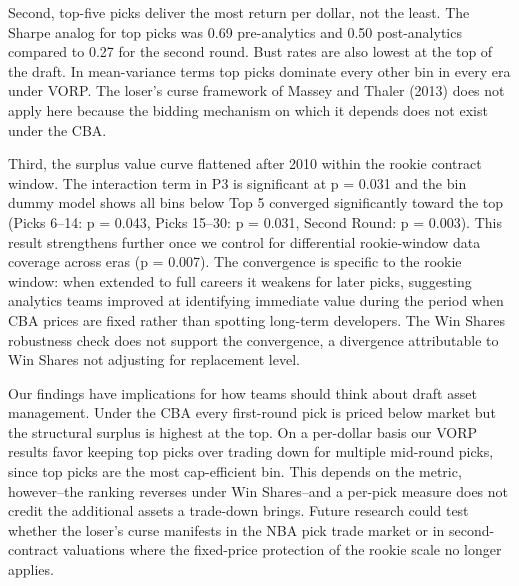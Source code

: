 \documentclass[12pt,letterpaper]{article}
\begin{document}
Second, top-five picks deliver the most return per dollar, not the least. The Sharpe analog for top picks was 0.69 pre-analytics and 0.50 post-analytics compared to 0.27 for the second round. Bust rates are also lowest at the top of the draft. In mean-variance terms top picks dominate every other bin in every era under VORP. The loser's curse framework of Massey and Thaler (2013) does not apply here because the bidding mechanism on which it depends does not exist under the CBA.

Third, the surplus value curve flattened after 2010 within the rookie contract window. The interaction term in P3 is significant at p = 0.031 and the bin dummy model shows all bins below Top 5 converged significantly toward the top (Picks 6--14: p = 0.043, Picks 15--30: p = 0.031, Second Round: p = 0.003). This result strengthens further once we control for differential rookie-window data coverage across eras (p = 0.007). The convergence is specific to the rookie window: when extended to full careers it weakens for later picks, suggesting analytics teams improved at identifying immediate value during the period when CBA prices are fixed rather than spotting long-term developers. The Win Shares robustness check does not support the convergence, a divergence attributable to Win Shares not adjusting for replacement level.

Our findings have implications for how teams should think about draft asset management. Under the CBA every first-round pick is priced below market but the structural surplus is highest at the top. On a per-dollar basis our VORP results favor keeping top picks over trading down for multiple mid-round picks, since top picks are the most cap-efficient bin. This depends on the metric, however--the ranking reverses under Win Shares--and a per-pick measure does not credit the additional assets a trade-down brings. Future research could test whether the loser's curse manifests in the NBA pick trade market or in second-contract valuations where the fixed-price protection of the rookie scale no longer applies.
\end{document}
